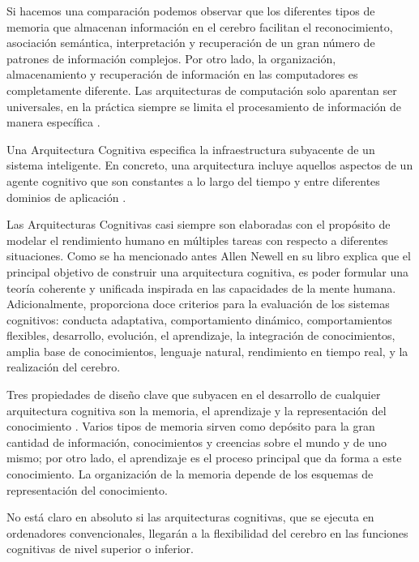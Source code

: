 Si hacemos una comparaci\'{o}n podemos observar que los diferentes tipos de memoria que almacenan informaci\'{o}n en el cerebro facilitan el reconocimiento, asociaci\'{o}n sem\'{a}ntica, interpretaci\'{o}n y recuperaci\'{o}n de un gran n\'{u}mero de patrones de informaci\'{o}n complejos. Por otro lado, la organizaci\'{o}n, almacenamiento y recuperaci\'{o}n de informaci\'{o}n en las computadores es completamente diferente. Las arquitecturas de computaci\'{o}n solo aparentan ser universales, en la pr\'{a}ctica siempre se limita el procesamiento de informaci\'{o}n de manera espec\'{i}fica \cite{duch2008cognitive}. 

Una Arquitectura Cognitiva especifica la infraestructura subyacente de un sistema inteligente. En concreto, una arquitectura incluye aquellos aspectos de un agente cognitivo que son constantes a lo largo del tiempo y entre
diferentes dominios de aplicación \cite{langley2009cognitive}.

Las Arquitecturas Cognitivas casi siempre son elaboradas con el prop\'{o}sito de  modelar el rendimiento humano en múltiples tareas con respecto a diferentes situaciones. Como se ha mencionado antes Allen Newell en su libro \cite{newell1994unified} explica que el principal objetivo de construir una arquitectura cognitiva, es poder formular una teor\'{i}a coherente y unificada inspirada en las capacidades de la mente humana. Adicionalmente, proporciona doce criterios para la evaluación de los sistemas cognitivos: conducta adaptativa, comportamiento dinámico, comportamientos flexibles, desarrollo, evolución, el aprendizaje, la integración de conocimientos, amplia base de conocimientos, lenguaje natural, rendimiento en tiempo real, y la realización del cerebro.

Tres propiedades de diseño clave que subyacen en el desarrollo de cualquier arquitectura cognitiva son la memoria,
el aprendizaje y la representaci\'{o}n del conocimiento \cite{langley2009cognitive,duch2008cognitive}. Varios tipos de memoria sirven como depósito para la gran cantidad de informaci\'{o}n, conocimientos y creencias sobre el mundo y de uno mismo; por otro lado, el aprendizaje es el proceso principal que da forma a este conocimiento. La organizaci\'{o}n de la memoria depende de los esquemas de representación del conocimiento. 
 
 No está claro en absoluto si las arquitecturas cognitivas, que se ejecuta en ordenadores convencionales, llegar\'{a}n a la flexibilidad del cerebro en las funciones cognitivas de nivel superior o inferior.
 
